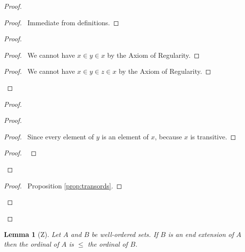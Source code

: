 \documentclass{book}
\let\qed\relax
\newtheorem{lm}[ax]{Lemma}
\theoremstyle{definition}
\begin{document}
\begin{proof}
\pf
{}
\begin{proof}
	\pf\ Immediate from definitions.
\end{proof}
\begin{proof}
	\begin{proof}
		\pf\ We cannot have $x \in y \in x$ by the Axiom of Regularity.
	\end{proof}
	\begin{proof}
		\pf\ We cannot have $x \in y \in z \in x$ by the Axiom of Regularity.
	\end{proof}
\end{proof}
\begin{proof}
	\begin{proof}
		\begin{proof}
			\pf\ Since every element of $y$ is an element of $x$, because $x$ is transitive.
		\end{proof}
		\begin{proof}
			\pf\ 
		\end{proof}
	\end{proof}
	\qedstep
	\begin{proof}
		\pf\ Proposition \ref{prop:transords}.
	\end{proof}
\end{proof}
\qed
\end{proof}

\begin{lm}[Z]
\label{lm:endextleq}
Let $A$ and $B$ be well-ordered sets. If $B$ is an end extension of $A$ then the ordinal of $A$ is $\leq$ the ordinal of $B$.
\end{lm}
\end{document}
